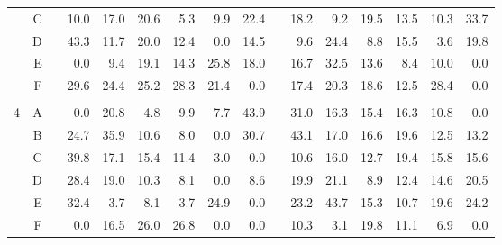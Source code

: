 \documentclass[12pt]{article}
\begin{document}
\begin{sidewaysfigure}
\begin{center}
\begin{tabular}{rr|rrrrrrrrrrrrrr}
  & C & & 10.0  & 17.0  & 20.6  & 5.3   & 9.9   & 22.4  && 18.2  & 9.2   & 19.5  & 13.5  & 10.3  & 33.7  \\
  & D & & 43.3  & 11.7  & 20.0  & 12.4  & 0.0   & 14.5  && 9.6   & 24.4  & 8.8   & 15.5  & 3.6   & 19.8  \\
  & E & & 0.0   & 9.4   & 19.1  & 14.3  & 25.8  & 18.0  && 16.7  & 32.5  & 13.6  & 8.4   & 10.0  & 0.0   \\
  & F & & 29.6  & 24.4  & 25.2  & 28.3  & 21.4  & 0.0   && 17.4  & 20.3  & 18.6  & 12.5  & 28.4  & 0.0   \\ & \\
4 & A & & 0.0   & 20.8  & 4.8   & 9.9   & 7.7   & 43.9  && 31.0  & 16.3  & 15.4  & 16.3  & 10.8  & 0.0   \\
  & B & & 24.7  & 35.9  & 10.6  & 8.0   & 0.0   & 30.7  && 43.1  & 17.0  & 16.6  & 19.6  & 12.5  & 13.2  \\
  & C & & 39.8  & 17.1  & 15.4  & 11.4  & 3.0   & 0.0   && 10.6  & 16.0  & 12.7  & 19.4  & 15.8  & 15.6  \\
  & D & & 28.4  & 19.0  & 10.3  & 8.1   & 0.0   & 8.6   && 19.9  & 21.1  & 8.9   & 12.4  & 14.6  & 20.5  \\
  & E & & 32.4  & 3.7   & 8.1   & 3.7   & 24.9  & 0.0   && 23.2  & 43.7  & 15.3  & 10.7  & 19.6  & 24.2  \\
  & F & & 0.0   & 16.5  & 26.0  & 26.8  & 0.0   & 0.0   && 10.3  & 3.1   & 19.8  & 11.1  & 6.9   & 0.0   \\
\hline
\end{tabular}
\end{center}
\end{sidewaysfigure}
\end{document}
